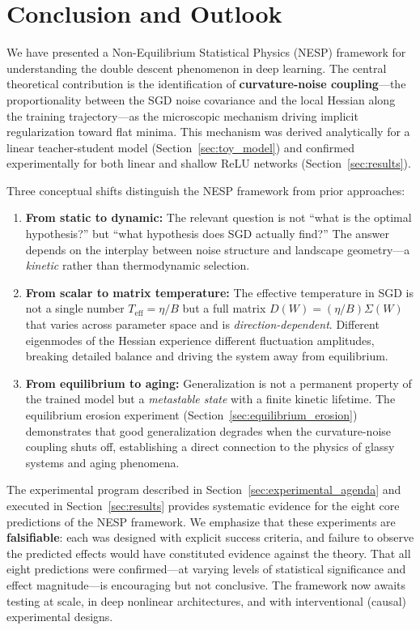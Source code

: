 \documentclass[
  journal=largetwo,
  year=2025,
  volume=37,
]{cup-journal}
\begin{document}
\newpage
\section{Conclusion and Outlook}\label{sec:conclusion}

We have presented a Non-Equilibrium Statistical Physics (NESP) framework for understanding the double descent phenomenon in deep learning. The central theoretical contribution is the identification of \textbf{curvature-noise coupling}---the proportionality between the SGD noise covariance and the local Hessian along the training trajectory---as the microscopic mechanism driving implicit regularization toward flat minima. This mechanism was derived analytically for a linear teacher-student model (Section~\ref{sec:toy_model}) and confirmed experimentally for both linear and shallow ReLU networks (Section~\ref{sec:results}).

Three conceptual shifts distinguish the NESP framework from prior approaches:

\begin{enumerate}
    \item \textbf{From static to dynamic:} The relevant question is not ``what is the optimal hypothesis?'' but ``what hypothesis does SGD actually find?'' The answer depends on the interplay between noise structure and landscape geometry---a \textit{kinetic} rather than thermodynamic selection.

    \item \textbf{From scalar to matrix temperature:} The effective temperature in SGD is not a single number $T_{\mathrm{eff}} = \eta/B$ but a full matrix $D(W) = (\eta/B)\Sigma(W)$ that varies across parameter space and is \textit{direction-dependent}. Different eigenmodes of the Hessian experience different fluctuation amplitudes, breaking detailed balance and driving the system away from equilibrium.

    \item \textbf{From equilibrium to aging:} Generalization is not a permanent property of the trained model but a \textit{metastable state} with a finite kinetic lifetime. The equilibrium erosion experiment (Section~\ref{sec:equilibrium_erosion}) demonstrates that good generalization degrades when the curvature-noise coupling shuts off, establishing a direct connection to the physics of glassy systems and aging phenomena.
\end{enumerate}

The experimental program described in Section~\ref{sec:experimental_agenda} and executed in Section~\ref{sec:results} provides systematic evidence for the eight core predictions of the NESP framework. We emphasize that these experiments are \textbf{falsifiable}: each was designed with explicit success criteria, and failure to observe the predicted effects would have constituted evidence against the theory. That all eight predictions were confirmed---at varying levels of statistical significance and effect magnitude---is encouraging but not conclusive. The framework now awaits testing at scale, in deep nonlinear architectures, and with interventional (causal) experimental designs.
\end{document}
